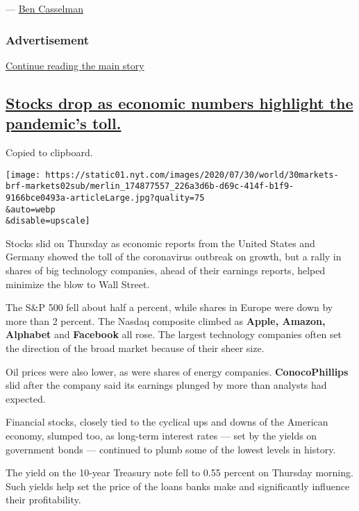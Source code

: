 --- \href{https://www.nytimes.com/by/ben-casselman}{Ben Casselman}

\hypertarget{advertisement-2}{%
\subsubsection{Advertisement}\label{advertisement-2}}

\protect\hyperlink{after-dfp-ad-mid3}{Continue reading the main story}

\hypertarget{stocks-drop-as-economic-numbers-highlight-the-pandemics-toll}{%
\subsection{\texorpdfstring{\protect\hyperlink{stocks-drop-as-economic-numbers-highlight-the-pandemics-toll}{Stocks
drop as economic numbers highlight the pandemic's
toll.}}{Stocks drop as economic numbers highlight the pandemic's toll.}}\label{stocks-drop-as-economic-numbers-highlight-the-pandemics-toll}}

Copied to clipboard.

\texttt{[image: https://static01.nyt.com/images/2020/07/30/world/30markets-brf-markets02sub/merlin\_174877557\_226a3d6b-d69c-414f-b1f9-9166bce0493a-articleLarge.jpg?quality=75\\\&auto=webp\\\&disable=upscale]}

Stocks slid on Thursday as economic reports from the United States and
Germany showed the toll of the coronavirus outbreak on growth, but a
rally in shares of big technology companies, ahead of their earnings
reports, helped minimize the blow to Wall Street.

The S\&P 500 fell about half a percent, while shares in Europe were down
by more than 2 percent. The Nasdaq composite climbed as \textbf{Apple,
Amazon, Alphabet} and \textbf{Facebook} all rose. The largest technology
companies often set the direction of the broad market because of their
sheer size.

Oil prices were also lower, as were shares of energy companies.
\textbf{ConocoPhillips} slid after the company said its earnings plunged
by more than analysts had expected.

Financial stocks, closely tied to the cyclical ups and downs of the
American economy, slumped too, as long-term interest rates --- set by
the yields on government bonds --- continued to plumb some of the lowest
levels in history.

The yield on the 10-year Treasury note fell to 0.55 percent on Thursday
morning. Such yields help set the price of the loans banks make and
significantly influence their profitability.


